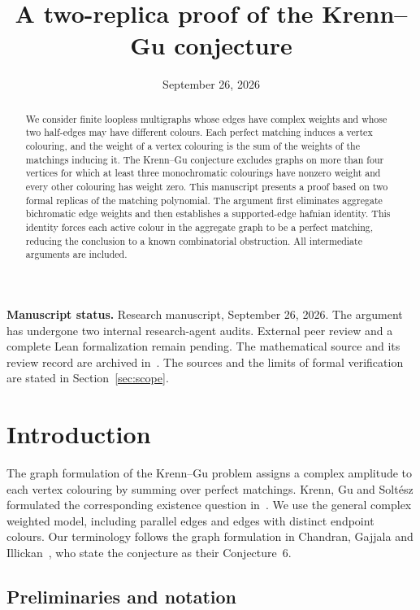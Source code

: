 \documentclass[11pt]{article}
\title{A two-replica proof of the Krenn--Gu conjecture}
\author{}
\date{September 26, 2026}
\theoremstyle{definition}
\theoremstyle{plain}
\numberwithin{equation}{section}
\begin{document}
\maketitle
\begin{abstract}
We consider finite loopless multigraphs whose edges have complex weights and
whose two half-edges may have different colours. Each perfect matching induces
a vertex colouring, and the weight of a vertex colouring is the sum of the
weights of the matchings inducing it. The Krenn--Gu conjecture excludes graphs
on more than four vertices for which at least three monochromatic colourings
have nonzero weight and every other colouring has weight zero. This manuscript
presents a proof based on two formal replicas of the matching polynomial.
The argument first eliminates aggregate bichromatic edge weights and then
establishes a supported-edge hafnian identity. This identity forces each active
colour in the aggregate graph to be a perfect matching, reducing the conclusion
to a known combinatorial obstruction.
All intermediate arguments are included.
\end{abstract}

\noindent\textbf{Manuscript status.}
Research manuscript, September 26, 2026. The argument has undergone two internal
research-agent audits. External peer review and a complete Lean formalization
remain pending. The mathematical source and its review record are archived
in~\cite{review}. The sources and the limits of formal verification are stated
in Section~\ref{sec:scope}.

\section{Introduction}\label{sec:introduction}

The graph formulation of the Krenn--Gu problem assigns a complex amplitude to
each vertex colouring by summing over perfect matchings. Krenn, Gu and
Solt\'esz formulated the corresponding existence question in~\cite[Question~1]{kgs}.
We use the general complex weighted model, including parallel edges and edges
with distinct endpoint colours. Our terminology follows the graph formulation
in Chandran, Gajjala and Illickan~\cite[Sections~1.1 and~1.4]{cgi}, who state
the conjecture as their Conjecture~6.

\subsection{Preliminaries and notation}
\end{document}
